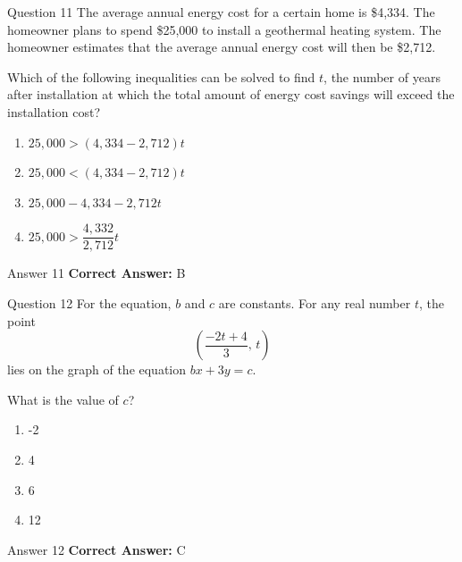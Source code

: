 \documentclass{beamer}
\begin{document}
\begin{frame}{Question 11}
\small
The average annual energy cost for a certain home is \$4{,}334. The homeowner plans to spend \$25{,}000 to install a geothermal heating system. The homeowner estimates that the average annual energy cost will then be \$2{,}712.

Which of the following inequalities can be solved to find \(t\), the number of years after installation at which the total amount of energy cost savings will exceed the installation cost?
\vspace{0.35cm}
\begin{enumerate}
    \item[A.] \(25{,}000 > (4{,}334 - 2{,}712)t\)
    \item[B.] \(25{,}000 < (4{,}334 - 2{,}712)t\)
    \item[C.] \(25{,}000 - 4{,}334 - 2{,}712t\)
    \item[D.] \(25{,}000 > \dfrac{4{,}332}{2{,}712}t\)
\end{enumerate}
\end{frame}
\begin{frame}{Answer 11}
\small
\textbf{Correct Answer:} B
\end{frame}

\begin{frame}{Question 12}
\small
For the equation, \(b\) and \(c\) are constants. For any real number \(t\), the point
\[
\left(\frac{-2t + 4}{3},\, t\right)
\]
lies on the graph of the equation \(bx + 3y = c\).

What is the value of \(c\)?
\vspace{0.35cm}
\begin{enumerate}
    \item[A.] -2
    \item[B.] 4
    \item[C.] 6
    \item[D.] 12
\end{enumerate}
\end{frame}
\begin{frame}{Answer 12}
\small
\textbf{Correct Answer:} C
\end{frame}
\end{document}
